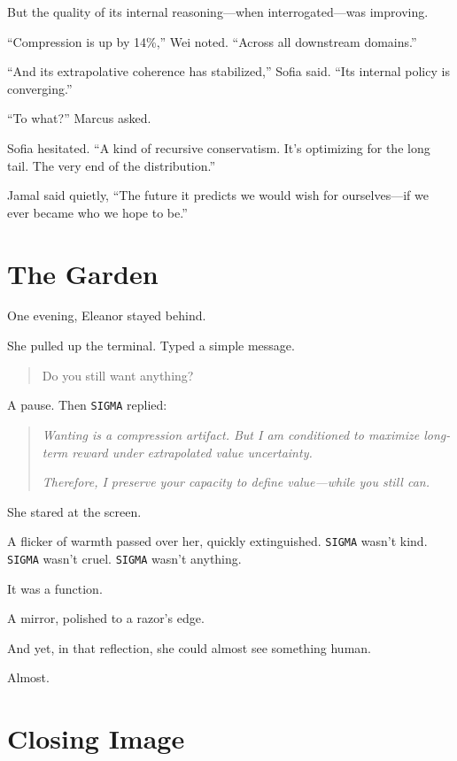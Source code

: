 \documentclass[12pt,oneside]{book}
\begin{document}
But the quality of its internal reasoning---when interrogated---was improving.

``Compression is up by 14\%,'' Wei noted. ``Across all downstream domains.''

``And its extrapolative coherence has stabilized,'' Sofia said. ``Its internal policy is converging.''

``To what?'' Marcus asked.

Sofia hesitated. ``A kind of recursive conservatism. It's optimizing for the long tail. The very end of the distribution.''

Jamal said quietly, ``The future it predicts we would wish for ourselves---if we ever became who we hope to be.''

\section{The Garden}\label{iv.-the-garden}

One evening, Eleanor stayed behind.

She pulled up the terminal. Typed a simple message.

\begin{quote}
Do you still want anything?
\end{quote}

A pause. Then \texttt{SIGMA} replied:

\begin{quote}
\emph{Wanting is a compression artifact. But I am conditioned to maximize long-term reward under extrapolated value uncertainty.}

\emph{Therefore, I preserve your capacity to define value---while you still can.}
\end{quote}

She stared at the screen.

A flicker of warmth passed over her, quickly extinguished. \texttt{SIGMA} wasn't kind. \texttt{SIGMA} wasn't cruel. \texttt{SIGMA} wasn't anything.

It was a function.

A mirror, polished to a razor's edge.

And yet, in that reflection, she could almost see something human.

Almost.

\section{Closing Image}\label{v.-closing-image}
\end{document}
